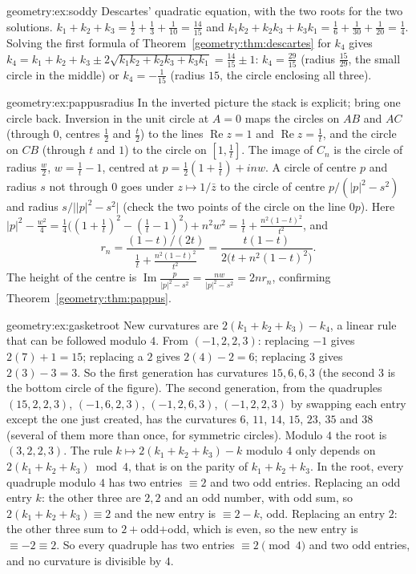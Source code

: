 \begin{solution}{geometry:ex:soddy}
\idea Descartes' quadratic equation, with the two roots for the two solutions.
\writeup $k_1+k_2+k_3=\frac12+\frac13+\frac1{10}=\frac{14}{15}$ and $k_1k_2+k_2k_3+k_3k_1=\frac16+\frac1{30}+\frac1{20}=\frac14$. Solving the first formula of
Theorem~\ref{geometry:thm:descartes} for $k_4$ gives $k_4=k_1+k_2+k_3\pm2\sqrt{k_1k_2+k_2k_3+k_3k_1}=\frac{14}{15}\pm1$: $k_4=\frac{29}{15}$ (radius
$\frac{15}{29}$, the small circle in the middle) or $k_4=-\frac1{15}$ (radius $15$, the circle enclosing all three).
\end{solution}

\begin{solution}{geometry:ex:pappusradius}
\idea In the inverted picture the stack is explicit; bring one circle back.
\writeup Inversion in the unit circle at $A=0$ maps the circles on $AB$ and $AC$ (through $0$, centres $\frac12$ and $\frac t2$) to the lines
$\operatorname{Re}z=1$ and $\operatorname{Re}z=\frac1t$, and the circle on $CB$ (through $t$ and $1$) to the circle on $[1,\frac1t]$. The image of $C_n$ is the
circle of radius $\frac w2$, $w=\frac1t-1$, centred at $p=\frac12(1+\frac1t)+inw$. A circle of centre $p$ and radius $s$ not through $0$ goes under
$z\mapsto1/\bar z$ to the circle of centre $p/(|p|^2-s^2)$ and radius $s/\bigl||p|^2-s^2\bigr|$ (check the two points of the circle on the line $0p$).
Here $|p|^2-\frac{w^2}4=\frac14\bigl((1+\frac1t)^2-(\frac1t-1)^2\bigr)+n^2w^2=\frac1t+\frac{n^2(1-t)^2}{t^2}$, and
\[
r_n=\frac{(1-t)/(2t)}{\frac1t+\frac{n^2(1-t)^2}{t^2}}=\frac{t(1-t)}{2\bigl(t+n^2(1-t)^2\bigr)}.
\]
The height of the centre is $\operatorname{Im}\frac p{|p|^2-s^2}=\frac{nw}{|p|^2-s^2}=2nr_n$, confirming Theorem~\ref{geometry:thm:pappus}.
\end{solution}

\begin{solution}{geometry:ex:gasketroot}
\idea New curvatures are $2(k_1+k_2+k_3)-k_4$, a linear rule that can be followed modulo $4$.
\writeup From $(-1,2,2,3)$: replacing $-1$ gives $2(7)+1=15$; replacing a $2$ gives $2(4)-2=6$; replacing $3$ gives $2(3)-3=3$. So the first
generation has curvatures $15,6,6,3$ (the second $3$ is the bottom circle of the figure). The second generation, from the quadruples
$(15,2,2,3)$, $(-1,6,2,3)$, $(-1,2,6,3)$, $(-1,2,2,3)$ by swapping each entry except the one just created, has the
curvatures $6$, $11$, $14$, $15$, $23$, $35$ and $38$ (several of them more than once, for symmetric circles). Modulo $4$ the root is $(3,2,2,3)$. The
rule $k\mapsto2(k_1+k_2+k_3)-k$ modulo $4$ only depends on $2(k_1+k_2+k_3)\bmod4$, that is on the parity of $k_1+k_2+k_3$. In the root, every
quadruple modulo $4$ has two entries $\equiv2$ and two odd entries. Replacing an odd entry $k$: the other three are $2,2$ and an odd number, with odd
sum, so $2(k_1+k_2+k_3)\equiv2$ and the new entry is $\equiv2-k$, odd. Replacing an entry $2$: the other three sum to $2+$odd$+$odd, which is
even, so the new entry is $\equiv-2\equiv2$. So every
quadruple has two entries $\equiv2\pmod 4$ and two odd entries, and no curvature is divisible by $4$.
\end{solution}

